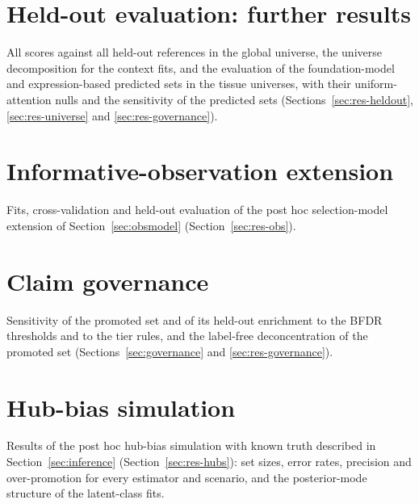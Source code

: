 \documentclass[11pt,a4paper]{article}
\begin{document}
\clearpage
\section{Held-out evaluation: further results}\label{sec:S-heldout}
All scores against all held-out references in the global universe, the universe decomposition for the context fits, and the evaluation of the foundation-model and expression-based predicted sets in the tissue universes, with their uniform-attention nulls and the sensitivity of the predicted sets (Sections~\ref{sec:res-heldout}, \ref{sec:res-universe} and \ref{sec:res-governance}).









\clearpage
\section{Informative-observation extension}\label{sec:S-obs}
Fits, cross-validation and held-out evaluation of the post hoc selection-model extension of Section~\ref{sec:obsmodel} (Section~\ref{sec:res-obs}).





\clearpage
\section{Claim governance}\label{sec:S-gov}
Sensitivity of the promoted set and of its held-out enrichment to the BFDR thresholds and to the tier rules, and the label-free deconcentration of the promoted set (Sections~\ref{sec:governance} and \ref{sec:res-governance}).






\clearpage
\section{Hub-bias simulation}\label{sec:S-sim}
Results of the post hoc hub-bias simulation with known truth described in Section~\ref{sec:inference} (Section~\ref{sec:res-hubs}): set sizes, error rates, precision and over-promotion for every estimator and scenario, and the posterior-mode structure of the latent-class fits.


\end{document}
